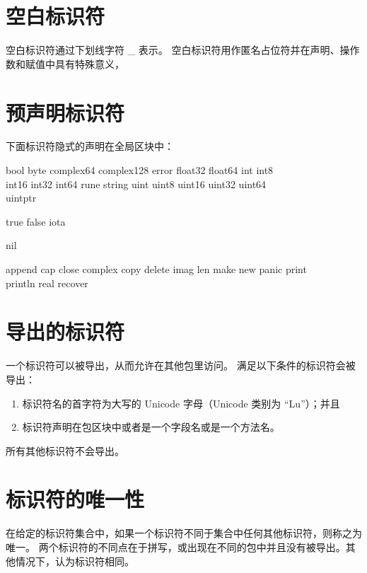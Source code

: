 \section{空白标识符}
空白标识符通过下划线字符 \_ 表示。
空白标识符用作匿名占位符并在声明、操作数和赋值中具有特殊意义，

\section{预声明标识符}
下面标识符隐式的声明在全局区块中：
\begin{description}[style=nextline,leftmargin=3\parindent]
\item[Types:] 	
	{\ttfamily bool byte complex64 complex128 error float32 float64 int int8 \\ int16 int32 int64 rune string	uint uint8 uint16 uint32 uint64 \\ uintptr}
\item[Constants:] 
	{\ttfamily true false iota}
\item[Zero value:] 
	{\ttfamily nil}
\item[Functions:] 
	{\ttfamily append cap close complex copy delete imag len make new panic print \\ println real recover}
\end{description}


\section{导出的标识符}
一个标识符可以被导出，从而允许在其他包里访问。
满足以下条件的标识符会被导出：
\begin{enumerate}
\item 标识符名的首字符为大写的 Unicode 字母（Unicode 类别为 ``Lu''）；并且
\item 标识符声明在包区块中或者是一个字段名或是一个方法名。
\end{enumerate}
所有其他标识符不会导出。

\section{标识符的唯一性}
在给定的标识符集合中，如果一个标识符不同于集合中任何其他标识符，则称之为唯一。
两个标识符的不同点在于拼写，或出现在不同的包中并且没有被导出。其他情况下，认为标识符相同。

